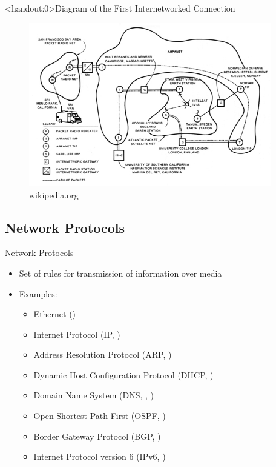 \begin{frame}<handout:0>{Diagram of the First Internetworked Connection}
	\begin{figure}
		\includegraphics[width=300pt]{../common/images/SRI_First_Internetworked_Connection_diagram.jpg}\\
		{\scriptsize wikipedia.org}
	\end{figure}
\end{frame}

\subsection{Network Protocols}
\begin{frame}{Network Protocols}
	\begin{itemize}[<+->]
		\item Set of rules for transmission of information over media
		\item Examples:
		\begin{itemize}
			\item Ethernet ()
			\item Internet Protocol (IP, )
			\item Address Resolution Protocol (ARP, )
			\item Dynamic Host Configuration Protocol (DHCP, )
			\item Domain Name System (DNS, , )
			\item Open Shortest Path First (OSPF, )
			\item Border Gateway Protocol (BGP, )
			\item Internet Protocol version 6 (IPv6, )
		\end{itemize}
	\end{itemize}
\end{frame}

